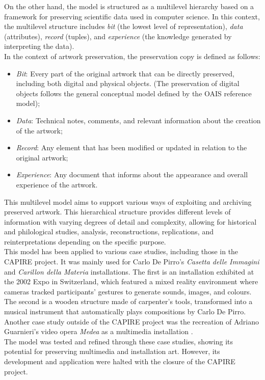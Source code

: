 On the other hand, the model is structured as a multilevel hierarchy based on a framework for preserving scientific data used in computer science. In this context, the multilevel structure includes \textit{bit} (the lowest level of representation), \textit{data} (attributes), \textit{record} (tuples), and \textit{experience} (the knowledge generated by interpreting the data).\\
In the context of artwork preservation, the preservation copy is defined as follows:
\begin{itemize}
    \item \textit{Bit}: Every part of the original artwork that can be directly preserved, including both digital and physical objects. (The preservation of digital objects follows the general conceptual model defined by the OAIS reference model);
    \item \textit{Data}: Technical notes, comments, and relevant information about the creation of the artwork;
    \item \textit{Record}: Any element that has been modified or updated in relation to the original artwork;
    \item \textit{Experience}: Any document that informs about the appearance and overall experience of the artwork.
\end{itemize}
This multilevel model aims to support various ways of exploiting and archiving preserved artwork. This hierarchical structure provides different levels of information with varying degrees of detail and complexity, allowing for historical and philological studies, analysis, reconstructions, replications, and reinterpretations depending on the specific purpose.\\
This model has been applied to various case studies, including those in the CAPIRE project. It was mainly used for Carlo De Pirro’s \textit{Casetta delle Immagini} and \textit{Carillon della Materia} installations. The first is an installation exhibited at the 2002 Expo in Switzerland, which featured a mixed reality environment where cameras tracked participants' gestures to generate sounds, images, and colours. The second is a wooden structure made of carpenter’s tools, transformed into a musical instrument that automatically plays compositions by Carlo De Pirro. Another case study outside of the CAPIRE project was the recreation of Adriano Guarnieri’s video opera \textit{Medea} as a multimedia installation \cite{bressan2009preserving, bressan2014challenge}.\\
The model was tested and refined through these case studies, showing its potential for preserving multimedia and installation art. However, its development and application were halted with the closure of the CAPIRE project.\\
